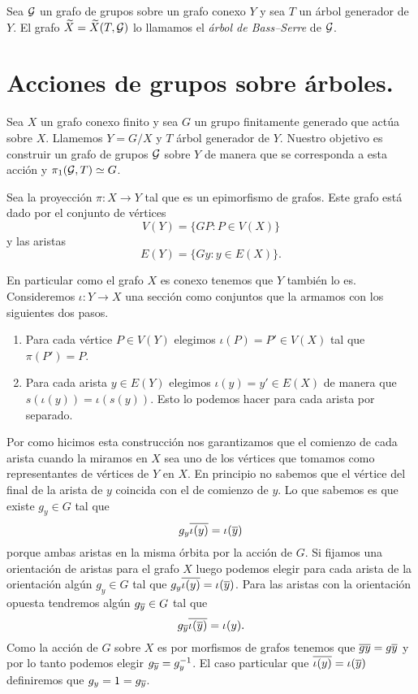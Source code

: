 \documentclass[tesis.tex]{subfiles}
\begin{document}
\begin{deff}
	Sea ${\cal G}$ un grafo de grupos sobre un grafo conexo $Y$ y sea $T$ un árbol generador de $Y$.	
	El grafo $\widetilde{ X} = \widetilde{ X} (T, {\cal G})$ lo llamamos el \emph{árbol de Bass--Serre} de ${\cal G}$.
\end{deff}



\section{Acciones de grupos sobre árboles.}\label{secc_acciones_arboles}

Sea $X$ un grafo conexo finito y sea $G$ un grupo finitamente generado que actúa sobre $X$.
Llamemos $Y = G / X$ y $T$ árbol generador de $Y$.
Nuestro objetivo es construir un grafo de grupos ${\cal G}$ sobre $Y$ de manera que se corresponda a esta acción y $\pi_1({\cal G},T) \simeq G$.
 
Sea la proyección $\pi: X \to Y$ tal que es un epimorfismo de grafos.
Este grafo está dado por el conjunto de vértices
\[
	V(Y) = \{ G P :  P \in V(X)    \}
\]
y las  aristas 
\[
	E(Y) = \{  Gy  : y \in E(X)  \}.
\]

En particular como el grafo $X$ es conexo tenemos que $Y$ también lo es.
Consideremos $\iota: Y \to X$ una sección como conjuntos que la armamos con los siguientes dos pasos.
\begin{enumerate}
	\item Para cada vértice $P \in V(Y)$ elegimos $\iota (P) = P' \in V(X)$ tal que $\pi(P') = P$.
	\item Para cada arista $y \in E(Y)$ elegimos $\iota(y) = y' \in E(X)$ de manera que $s(\iota(y)) = \iota (s(y))$. 
	Esto lo podemos hacer para cada arista por separado.
\end{enumerate}


Por como hicimos esta construcción nos garantizamos que el comienzo de cada arista cuando la miramos en $X$ sea uno de los vértices que tomamos como representantes de vértices de $Y$ en $X$.
En principio no sabemos que el vértice del final de la arista de $y$ coincida con el de comienzo de $y$. 
Lo que sabemos es que existe $g_y \in G$ tal que 
\[
	g_y \overline{\iota (y)} = \iota (\overline y)
\]
porque ambas aristas en la misma órbita por la acción de $G$.
Si fijamos una orientación de aristas para el grafo $X$ luego podemos elegir para cada arista de la orientación algún $g_y \in G$ tal que $g_y \overline{\iota (y)} = \iota (\overline y)$.
Para las aristas con la orientación opuesta tendremos algún $g_{\overline y} \in G$ tal que 
\[
	g_{\overline y} \overline{\iota(\overline y)} = \iota(y).
\]
Como la acción de $G$ sobre $X$ es por morfismos de grafos tenemos que $\overline {g y} = g \overline y$ y por lo tanto podemos elegir $g_{\overline y} = g_{y}^{-1}$.
El caso particular que $\overline{\iota (y)} = \iota (\overline y)$ definiremos que $g_y = 1 = g_{\overline y}$.
\end{document}
